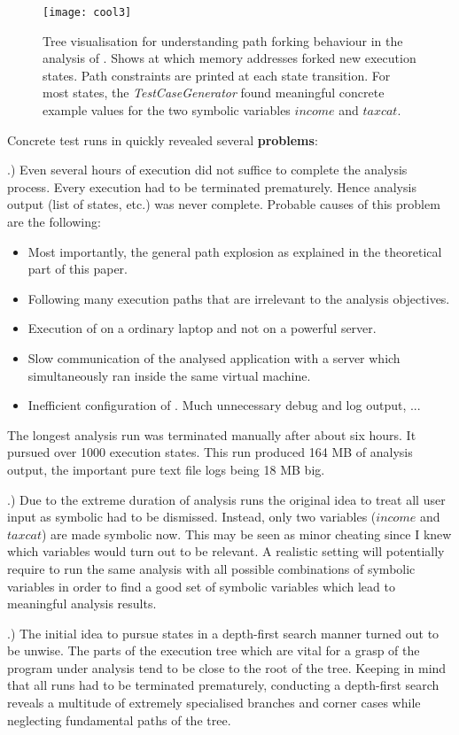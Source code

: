 \bigskip


\begin{figure*}
\texttt{[image: cool3]}
\caption{Tree visualisation for understanding path forking behaviour in the analysis of \app. Shows at which memory addresses \sse forked new execution states. Path constraints are printed at each state transition. For most states, the \textit{TestCaseGenerator} found meaningful concrete example values for the two symbolic variables $income$ and $taxcat$.}
\label{fig:tree}
\end{figure*}

Concrete test runs in \sse quickly revealed several \textbf{problems}:

.) Even several hours of execution did not suffice to complete the analysis process.
Every execution had to be terminated prematurely.
Hence analysis output (list of states, etc.) was never complete.
Probable causes of this problem are the following: 
\begin{itemize}
\item Most importantly, the general path explosion as explained in the theoretical part of this paper.
\item Following many execution paths that are irrelevant to the analysis objectives.
\item Execution of \sse on a ordinary laptop and not on a powerful server.
\item Slow communication of the analysed application with a server which simultaneously ran inside the same virtual machine.
\item Inefficient configuration of \sse. Much unnecessary debug and log output, ...
\end{itemize}
The longest analysis run was terminated manually after about six hours.
It pursued over 1000 execution states.
This run produced 164 MB of analysis output, the important pure text file logs being 18 MB big.

.) Due to the extreme duration of analysis runs the original idea to treat all user input as symbolic had to be dismissed. Instead, only two variables ($income$ and $taxcat$) are made symbolic now.
This may be seen as minor cheating since I knew which variables would turn out to be relevant.
A realistic setting will potentially require to run the same analysis with all possible combinations of symbolic variables in order to find a good set of symbolic variables which lead to meaningful analysis results.

.) The initial idea to pursue states in a depth-first search manner turned out to be unwise.
The parts of the execution tree which are vital for a grasp of the program under analysis tend to be close to the root of the tree.
Keeping in mind that all \sse runs had to be terminated prematurely, conducting a depth-first search reveals a multitude of extremely specialised branches and corner cases while neglecting fundamental paths of the tree.

